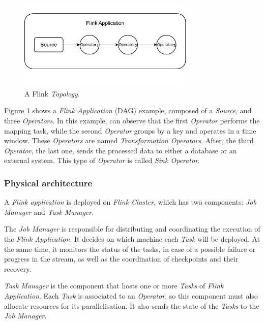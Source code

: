 \begin{figure}[!ht]
    \centering
    \includegraphics[width=0.75\textwidth]{figures/concepts/Flink-Logical.pdf}
    \caption{A Flink \textit{Topology}.}
    \label{fig:flink-logical}
\end{figure}

Figure \ref{fig:flink-logical} shows a \textit{Flink Application} (DAG) example, composed of a \textit{Source}, and three \textit{Operators}. In this example, can observe that the first \textit{Operator} performs the mapping task, while the second \textit{Operator} groups by a key and operates in a time window. These \textit{Operators} are named \textit{Transformation Operators}. After, the third \textit{Operator}, the last one, sends the processed data to either a database or an external system. This type of \textit{Operator} is called \textit{Sink Operator}.

\subsubsection{Physical architecture}

A \textit{Flink application} is deployed on \textit{Flink Cluster}, which has two components: \textit{Job Manager} and \textit{Task Manager}.

The \textit{Job Manager} is responsible for distributing and coordinating the execution of the \textit{Flink Application}. It decides on which machine each \textit{Task} will be deployed. At the same time, it monitors the status of the tasks, in case of a possible failure or progress in the stream, as well as the coordination of checkpoints and their recovery.

\textit{Task Manager} is the component that hosts one or more \textit{Tasks} of \textit{Flink Application}. Each \textit{Task} is associated to an \textit{Operator}, so this component must also allocate resources for its parallelisation. It also sends the state of the \textit{Tasks} to the \textit{Job Manager}.

